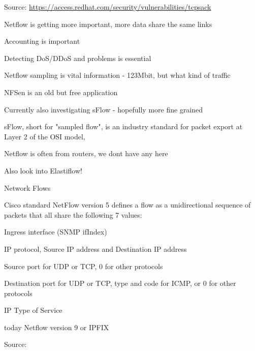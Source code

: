 \documentclass[Screen16to9,17pt]{foils}
\begin{document}
Source: {\footnotesize\url{https://access.redhat.com/security/vulnerabilities/tcpsack}}



\begin{list2}
\item Netflow is getting more important, more data share the same links
\item Accounting is important
\item Detecting DoS/DDoS and problems is essential
\item Netflow sampling is vital information - 123Mbit, but what kind of traffic
\item NFSen is an old but free application
\item Currently also investigating sFlow - hopefully more fine grained
\item sFlow, short for "sampled flow", is an industry standard for packet export at Layer 2 of the OSI model, \\
\end{list2}

\centerline{Netflow is often from routers, we dont have any here}

Also look into Elastiflow! 



\begin{list1}
\item Network Flows
\item Cisco standard NetFlow version 5 defines a flow as a unidirectional sequence of packets that all share the following 7 values:
\begin{list2}
\item Ingress interface (SNMP ifIndex)
\item IP protocol, Source IP address and Destination IP address
\item Source port for UDP or TCP, 0 for other protocols
\item Destination port for UDP or TCP, type and code for ICMP, or 0 for other protocols
\item IP Type of Service
\end{list2}
\item today Netflow version 9 or IPFIX
\end{list1}

Source: \\{\footnotesize
{}\\
}
\end{document}
